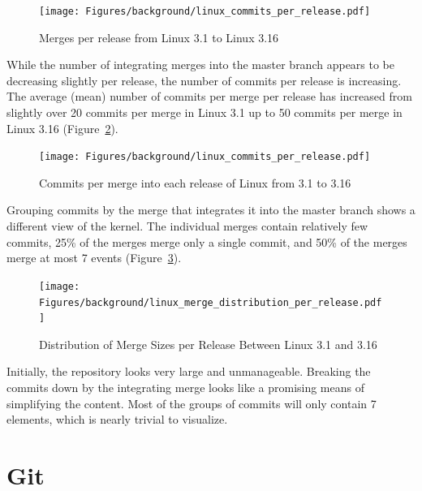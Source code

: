\begin{figure}[htpb]
  \centering
  \texttt{[image: Figures/background/linux\_commits\_per\_release.pdf]}
  \caption{Merges per release from Linux 3.1 to Linux 3.16}
  \label{fig:linux_merges_per_release}
\end{figure}

While the number of integrating merges into the master branch appears to
be decreasing slightly per release, the number of commits per release is
increasing. The average (mean) number of commits per merge per release
has increased from slightly over 20 commits per merge in Linux 3.1 up to
50 commits per merge in Linux 3.16
(Figure~\ref{fig:linux_commits_per_merge_per_release}).

\begin{figure}[htpb]
  \centering
  \texttt{[image: Figures/background/linux\_commits\_per\_release.pdf]}
  \caption{Commits per merge into each release of Linux from 3.1 to 3.16
    }
  \label{fig:linux_commits_per_merge_per_release}
\end{figure}

Grouping commits by the merge that integrates it into the master branch
shows a different view of the kernel. The individual merges contain
relatively few commits, 25\% of the merges merge only a single commit,
and 50\% of the merges merge at most 7 events
(Figure~\ref{fig:linux_merge_distribution_per_release}).

\begin{figure}[htpb]
  \centering
  \texttt{[image: Figures/background/linux\_merge\_distribution\_per\_release.pdf]}
  \caption{Distribution of Merge Sizes per Release Between Linux 3.1 and
  3.16}
  \label{fig:linux_merge_distribution_per_release}
\end{figure}

Initially, the repository looks very large and unmanageable. Breaking
the commits down by the integrating merge looks like a promising means
of simplifying the content. Most of the groups of commits will only
contain 7 elements, which is nearly trivial to visualize.

\section{Git}\label{sec:git}

